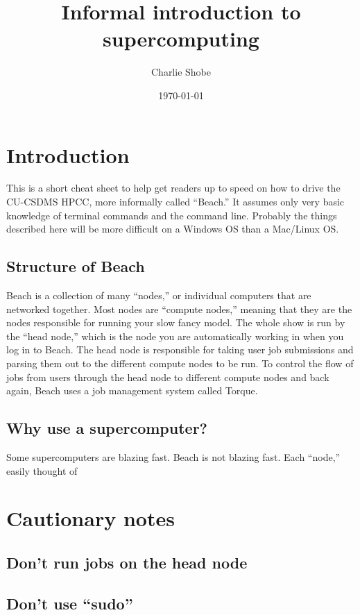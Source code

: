 \documentclass[12pt, oneside]{article}   	%
\title{Informal introduction to supercomputing}
\author{Charlie Shobe}
\date{\today}							%
\begin{document}
\maketitle

\tableofcontents


\section{Introduction}
This is a short cheat sheet to help get readers up to speed on how to drive the CU-CSDMS HPCC, more informally called ``Beach.'' It assumes only very basic knowledge of terminal commands and the command line. Probably the things described here will be more difficult on a Windows OS than a Mac/Linux OS.
\subsection{Structure of Beach}
Beach is a collection of many ``nodes,'' or individual computers that are networked together. Most nodes are ``compute nodes,'' meaning that they are the nodes responsible for running your slow fancy model. The whole show is run by the ``head node,'' which is the node you are automatically working in when you log in to Beach. The head node is responsible for taking user job submissions and parsing them out to the different compute nodes to be run. To control the flow of jobs from users through the head node to different compute nodes and back again, Beach uses a job management system called Torque.
\subsection{Why use a supercomputer?}
Some supercomputers are blazing fast. Beach is not blazing fast. Each ``node,'' easily thought of 

\section{Cautionary notes}
\subsection{Don't run jobs on the head node}
\subsection{Don't use ``sudo''}
\end{document}

